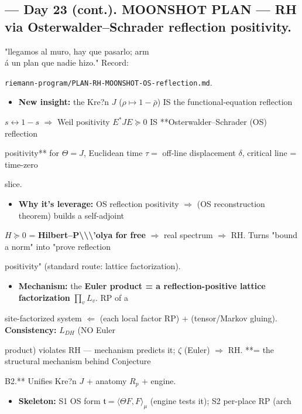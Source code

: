 \documentclass[10pt]{article}
\begin{document}
\subsection*{ --- Day 23 (cont.). MOONSHOT PLAN --- RH via Osterwalder--Schrader reflection positivity.}

"llegamos al muro, hay que pasarlo; arm\\\'a un plan que nadie hizo." Record:\par
\texttt{riemann-program/PLAN-RH-MOONSHOT-OS-reflection.md}.\par
\begin{itemize}
\item \textbf{New insight:} the Kre?n $J$ ($\rho\mapsto1-\bar\rho$) IS the functional-equation reflection
\end{itemize}
  $s\leftrightarrow1-s$ \ensuremath{\Rightarrow} Weil positivity $E^*JE\succeq0$ IS **Osterwalder--Schrader (OS) reflection\par
  positivity** for $\Theta=J$, Euclidean time $\tau=$ off-line displacement $\delta$, critical line = time-zero\par
  slice.\par
\begin{itemize}
\item \textbf{Why it's leverage:} OS reflection positivity \ensuremath{\Rightarrow} (OS reconstruction theorem) builds a self-adjoint
\end{itemize}
  $H\succeq0$ = \textbf{Hilbert--P\textbackslash{}\textbackslash{}\textbackslash{}'olya for free} \ensuremath{\Rightarrow} real spectrum \ensuremath{\Rightarrow} RH. Turns "bound a norm" into "prove reflection\par
  positivity" (standard route: lattice factorization).\par
\begin{itemize}
\item \textbf{Mechanism:} the \textbf{Euler product = a reflection-positive lattice factorization} $\prod_v L_v$. RP of a
\end{itemize}
  site-factorized system \ensuremath{\Leftarrow} (each local factor RP) + (tensor/Markov gluing). \textbf{Consistency:} $L_{DH}$ (NO Euler\par
  product) violates RH --- mechanism predicts it; \ensuremath{\zeta} (Euler) \ensuremath{\Rightarrow} RH. **= the structural mechanism behind Conjecture\par
  B2.** Unifies Kre?n $J$ + anatomy $R_p$ + engine.\par
\begin{itemize}
\item \textbf{Skeleton:} S1 OS form $\mathfrak t=\langle\Theta F,F\rangle_\mu$ (engine tests it); S2 per-place RP (arch
\end{itemize}
\end{document}
